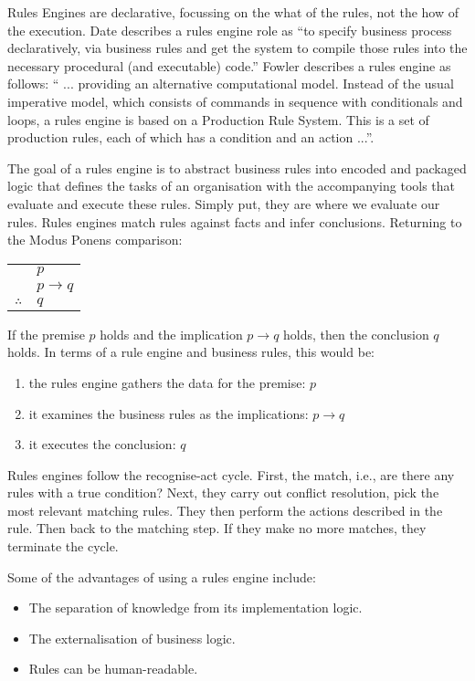 Rules Engines are declarative, focussing on the what of the rules, not the how of the execution.
Date\cite{date2000not} describes a rules engine role as ``to specify business process declaratively, via business rules and get the system to compile those rules into the necessary procedural (and executable) code.''
Fowler\cite{Fowler_rulesEngine} describes a rules engine as follows: `` ... providing an alternative computational model.
Instead of the usual imperative model, which consists of commands in sequence with conditionals and loops, a rules engine is based on a Production Rule System.
This is a set of production rules, each of which has a condition and an action ...''.

The goal of a rules engine is to abstract business rules into encoded and packaged logic that defines the tasks of an organisation with the accompanying tools that evaluate and execute these rules.
Simply put, they are where we evaluate our rules.
Rules engines match rules against facts and infer conclusions.
Returning to the Modus Ponens comparison:

\begin{tabular}{c@{\,}l@{}} 
    & $p$ \\
\arrayrulecolor{blue!60!green!70}    & $p \to q$ \\\cline{2-2}
$\therefore$         & $q$ \\
\end{tabular}

If the premise $p$ holds and the implication $p \to q$ holds, then the conclusion $q$ holds.
In terms of a rule engine and business rules, this would be:
\begin{enumerate}
    \setlength\itemsep{0em}
    \item the rules engine gathers the data for the premise: $p$
    \item it examines the business rules as the implications: $p \to q$
    \item it executes the conclusion: $q$
\end{enumerate}

Rules engines follow the recognise-act cycle.
First, the match, i.e., are there any rules with a true condition?
Next, they carry out conflict resolution, pick the most relevant matching rules.
They then perform the actions described in the rule.
Then back to the matching step.
If they make no more matches, they terminate the cycle.

Some of the advantages of using a rules engine include:
\begin{itemize}
    \setlength\itemsep{0em}
    \item The separation of knowledge from its implementation logic.
    \item The externalisation of business logic.
    \item Rules can be human-readable.
\end{itemize}

